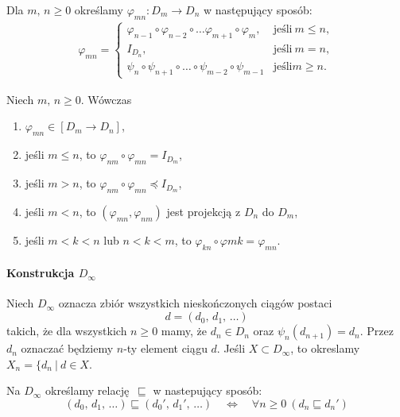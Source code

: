 \begin{definicja}%
Dla \(m,\,n\geq 0\) określamy \(\varphi_{mn}:D_m \to D_n\) w następujący sposób:
\begin{align}
\varphi_{mn} =
\begin{cases}
\varphi_{n-1} \circ \varphi_{n-2} \circ \dots \varphi_{m+1} \circ \varphi_m, & \text{jeśli}\ m\leq n,\\
I_{D_n}, & \text{jeśli}\ m=n,\\
\psi_n \circ \psi_{n+1} \circ \dots \circ \psi_{m-2}\circ \psi_{m-1} & \text{jeśli} m\geq n.
\end{cases}
\end{align}
\end{definicja}

\begin{lemat}%
Niech \(m,\,n\geq 0\). Wówczas
\begin{enumerate}
\item \(\varphi_{mn}\in [D_m\to D_n]\),
\item jeśli \(m\leq n\), to \(\varphi_{nm}\circ \varphi_{mn} = I_{D_m}\),
\item jeśli \(m>n\), to \(\varphi_{nm}\circ \varphi_{mn} \preceq I_{D_m}\),
\item jeśli \(m<n\), to \((\varphi_{mn},\varphi_{nm})\) jest projekcją z \(D_n\) do \(D_m\),
\item jeśli \(m<k<n\) lub \(n<k<m\), to \(\varphi_{kn}\circ\varphi{mk}=\varphi_{mn}\).
\end{enumerate}
\end{lemat}

\paragraph{Konstrukcja \(D_\infty\)}

\begin{definicja}%
Niech \(D_\infty\) oznacza zbiór wszystkich nieskończonych ciągów postaci
\[
d=(d_0,\,d_1,\,\dots)
\]
takich, że dla wszystkich \(n\geq 0\) mamy, że \(d_n\in D_n\) oraz \(\psi_n (d_{n+1}) = d_n\). Przez \(d_n\) oznaczać będziemy \(n\)-ty element ciągu \(d\). Jeśli \(X\subset D_\infty\), to okreslamy \(X_n=\{ d_n\ |\ d\in X\).

Na \(D_\infty\) określamy relację \(\sqsubseteq\) w nastepujący sposób:
\[
(d_0,\,d_1,\,\dots) \sqsubseteq (d_0',\,d_1',\,\dots) \quad \Leftrightarrow\quad  \forall n\geq 0\  (d_n\sqsubseteq d_n') 
\]
\end{definicja}

